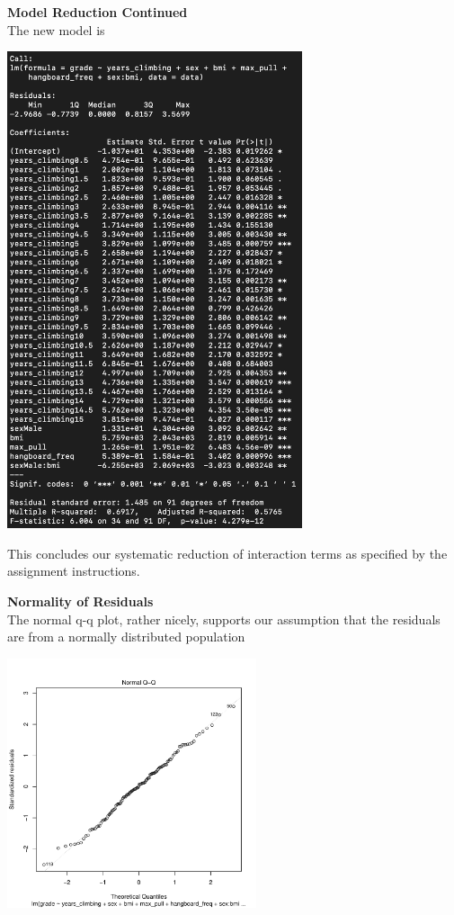 \documentclass[11pt]{amsart}
\begin{document}
\newpage
{\bf Model Reduction Continued}\\
The new model is\
\begin{center}
\includegraphics[width=0.65\textwidth]{mod6}
\end{center}
\vspace{0.15in}
This concludes our systematic reduction of interaction terms as specified by the assignment instructions.

 
\newpage
{\bf Normality of Residuals}\\
The normal q-q plot, rather nicely, supports our assumption that the residuals are from a normally distributed population
\begin{center}
\includegraphics[width=0.55\textwidth]{1.pdf}
\end{center}
\vspace{0.15in}
\end{document}
